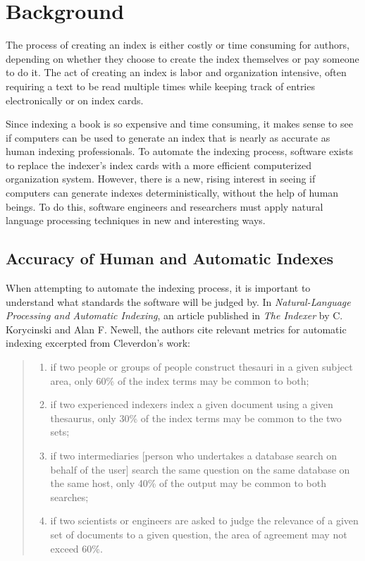 \section{Background}
The process of creating an index is either costly or time consuming for authors, depending on whether they choose to create the index themselves or pay someone to do it.
The act of creating an index is labor and organization intensive, often requiring a text to be read multiple times while keeping track of entries electronically or on index cards.

Since indexing a book is so expensive and time consuming, it makes sense to see if computers can be used to generate an index that is nearly as accurate as human indexing professionals.
To automate the indexing process, software exists to replace the indexer's index cards with a more efficient computerized organization system.
However, there is a new, rising interest in seeing if computers can generate indexes deterministically, without the help of human beings.
To do this, software engineers and researchers must apply natural language processing techniques in new and interesting ways.

\subsection{Accuracy of Human and Automatic Indexes}

When attempting to automate the indexing process, it is important to understand what standards the software will be judged by.
In {\it Natural-Language Processing and Automatic Indexing}, an article published in {\it The Indexer} by C. Korycinski and Alan F. Newell, the authors cite relevant metrics for automatic indexing excerpted from Cleverdon's work:

\begin{quote}
\begin{enumerate}
\item if two people or groups of people construct thesauri in a given subject area, only 60\% of the index terms may be common to both;
\item if two experienced indexers index a given document using a given thesaurus, only 30\% of the index terms may be common to the two sets;
\item if two intermediaries [person who undertakes a database search on behalf of the user] search the same question on the same database on the same host, only 40\% of the output may be common to both searches;
\item if two scientists or engineers are asked to judge the relevance of a given set of documents to a given question, the area of agreement may not exceed 60\%.\cite{automatic-indexing}
\end{enumerate}
\end{quote}

